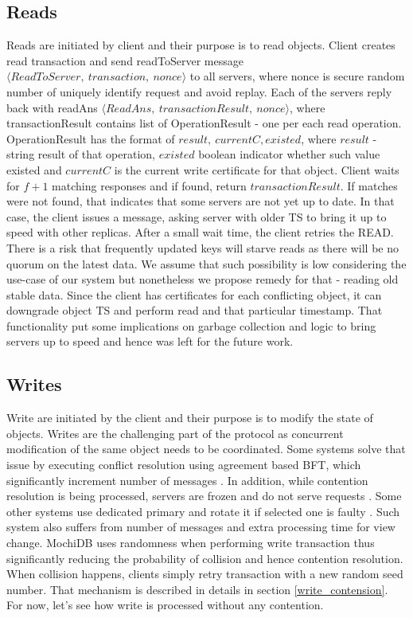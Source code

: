 \documentclass[letterpaper,twocolumn,10pt]{article}
\begin{document}
\subsection{Reads}
Reads are initiated by client and their purpose is to read objects. Client creates read transaction and send readToServer message $\langle ReadToServer,\ transaction,\ nonce \rangle$ to all servers, where nonce is secure random number of uniquely identify request and avoid replay. Each of the servers reply back with readAns $\langle ReadAns,\ transactionResult,\ nonce \rangle$, where transactionResult contains list of OperationResult - one per each read operation. OperationResult has the format of ${result,\ currentC, existed}$, where $result$ - string result of that operation, $existed$ boolean indicator whether such value existed and $currentC$ is the current write certificate for that object.
Client waits for $f+1$ matching responses and if found, return $transactionResult$. If matches were not found, that indicates that some servers are not yet up to date. In that case, the client issues a message, asking server with older TS to bring it up to speed with other replicas. After a small wait time, the client retries the READ.
There is a risk that frequently updated keys will starve reads as there will be no quorum on the latest data. We assume that such possibility is low considering the use-case of our system but nonetheless we propose remedy for that - reading old stable data. Since the client has certificates for each conflicting object, it can downgrade object TS and perform read and that particular timestamp. That functionality put some implications on garbage collection and logic to bring servers up to speed and hence was left for the future work.

\subsection{Writes} \label{Protocol_Writes}
Write are initiated by the client and their purpose is to modify the state of objects. Writes are the challenging part of the protocol as concurrent modification of the same object needs to be coordinated. Some systems solve that issue by executing conflict resolution using agreement based BFT, which significantly increment number of messages \cite{HQ_replication}. In addition, while contention resolution is being processed, servers are frozen and do not serve requests \cite{HQ_replication}. Some other systems use dedicated primary and rotate it if selected one is faulty \cite{Practical_BFT}. Such system also suffers from number of messages and extra processing time for view change.
MochiDB uses randomness when performing write transaction thus significantly reducing the probability of collision and hence contention resolution. When collision happens, clients simply retry transaction with a new random seed number. That mechanism is described in details in section \ref{write_contension}. For now, let's see how write is processed without any contention.
\end{document}
